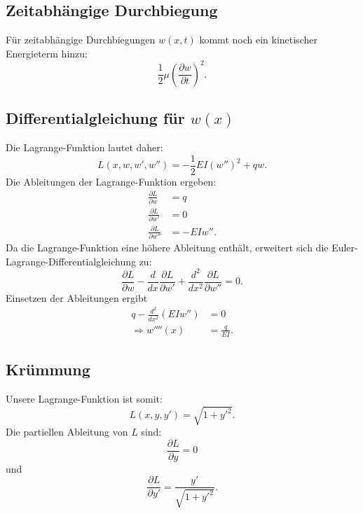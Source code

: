 \subsection{Zeitabhängige Durchbiegung}
Für zeitabhängige Durchbiegungen $w(x,t)$ kommt noch ein kinetischer Energieterm hinzu:
\begin{equation*}
	\frac{1}{2} \mu \left( \frac{\partial w}{\partial t} \right)^2.
\end{equation*}

\subsection{Differentialgleichung für $w(x)$}
Die Lagrange-Funktion lautet daher:
\begin{equation*}
	L(x,w,w',w'') = -\frac{1}{2} E I (w'')^2 + q w.
\end{equation*}
Die Ableitungen der Lagrange-Funktion ergeben:
\begin{align*}
	\frac{\partial L}{\partial w} &= q \\
	\frac{\partial L}{\partial w'} &= 0 \\
	\frac{\partial L}{\partial w''} &= -E I w''.
\end{align*}
Da die Lagrange-Funktion eine höhere Ableitung enthält, erweitert sich die Euler-Lagrange-Differentialgleichung zu:
\begin{equation*}
	\frac{\partial L}{\partial w} - \frac{d}{dx} \frac{\partial L}{\partial w'} + \frac{d^2}{dx^2} \frac{\partial L}{\partial w''} = 0.
\end{equation*}
Einsetzen der Ableitungen ergibt
	\begin{align}
		q - \frac{d^2}{dx^2}(E I w'') &= 0 \\
		\Rightarrow w''''(x) &= \frac{q}{E I}.
	\end{align}

\subsection{Krümmung}
Unsere Lagrange-Funktion ist somit:
\begin{equation*}
	L(x,y,y') = \sqrt{1 + {y'}^2}.
\end{equation*}
Die partiellen Ableitung von $L$ sind:
\begin{equation*}
	\frac{\partial L}{\partial y} = 0
\end{equation*}
und
\begin{equation*}
	\frac{\partial L}{\partial y'} = \frac{y'}{\sqrt{1 + {y'}^2}}.
\end{equation*}

